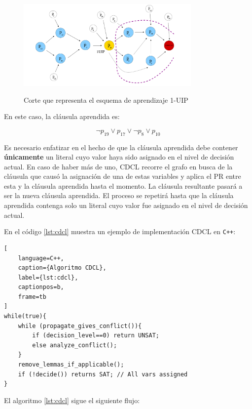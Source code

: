 \begin{figure}[ht]
    \centering
    \includegraphics[width=0.8\textwidth]{Graphics/first_uip.png}
    \caption{Corte que representa el esquema de aprendizaje 1-UIP}
    \cite{oliveras2009dpll_cdcl}
    \label{fig:graph_1-uip}
\end{figure}

En este caso, la cl\'ausula aprendida es:

\begin{equation*}
\neg p_{19} \lor p_{17} \lor \neg p_8 \lor p_{10}
\end{equation*}


Es necesario enfatizar en el hecho de que la cl\'ausula aprendida debe contener \textbf{\'unicamente} un literal cuyo valor haya sido asignado en el nivel de decisi\'on actual. En caso de haber m\'as de uno, CDCL recorre el grafo en busca de la cl\'ausula que caus\'o la asignaci\'on de una de estas variables y aplica el PR entre esta y la cl\'ausula aprendida hasta el momento. La cl\'ausula resultante pasar\'a a ser la nueva cl\'ausula aprendida. El proceso se repetir\'a hasta que la cl\'ausula aprendida contenga solo un literal cuyo valor fue asignado en el nivel de decisi\'on actual.

En el c\'odigo \ref{lst:cdcl} \cite{oliveras2009dpll_cdcl} muestra un ejemplo de implementaci\'on CDCL en \texttt{C++}:

\begin{lstlisting}[
    language=C++,
    caption={Algoritmo CDCL},
    label={lst:cdcl},
    captionpos=b,
    frame=tb
]
while(true){
	while (propagate_gives_conflict()){
		if (decision_level==0) return UNSAT;
		else analyze_conflict();
	}
	remove_lemmas_if_applicable();
	if (!decide()) returns SAT; // All vars assigned
}
\end{lstlisting}

El algoritmo \ref{lst:cdcl} sigue el siguiente flujo:

